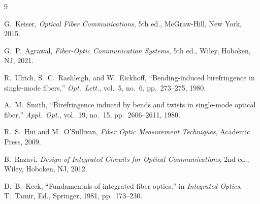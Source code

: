 ﻿\documentclass[11pt,a4paper]{article}
\begin{document}
\begin{thebibliography}{9}

  G.~Keiser, \emph{Optical Fiber Communications}, 5th ed., McGraw-Hill,
  New York, 2015.

  G.~P.~Agrawal, \emph{Fiber-Optic Communication Systems}, 5th ed., Wiley,
  Hoboken, NJ, 2021.

  R.~Ulrich, S.~C.~Rashleigh, and W.~Eickhoff, ``Bending-induced
  birefringence in single-mode fibers,'' \emph{Opt.\ Lett.}, vol.~5, no.~6,
  pp.~273--275, 1980.

  A.~M.~Smith, ``Birefringence induced by bends and twists in single-mode
  optical fiber,'' \emph{Appl.\ Opt.}, vol.~19, no.~15, pp.~2606--2611,
  1980.

  R.~S.~Hui and M.~O'Sullivan, \emph{Fiber Optic Measurement Techniques},
  Academic Press, 2009.

  B.~Razavi, \emph{Design of Integrated Circuits for Optical Communications},
  2nd ed., Wiley, Hoboken, NJ, 2012.

  D.~B.~Keck, ``Fundamentals of integrated fiber optics,'' in
  \emph{Integrated Optics}, T.~Tamir, Ed., Springer, 1981, pp.~173--230.

\end{thebibliography}
\end{document}
